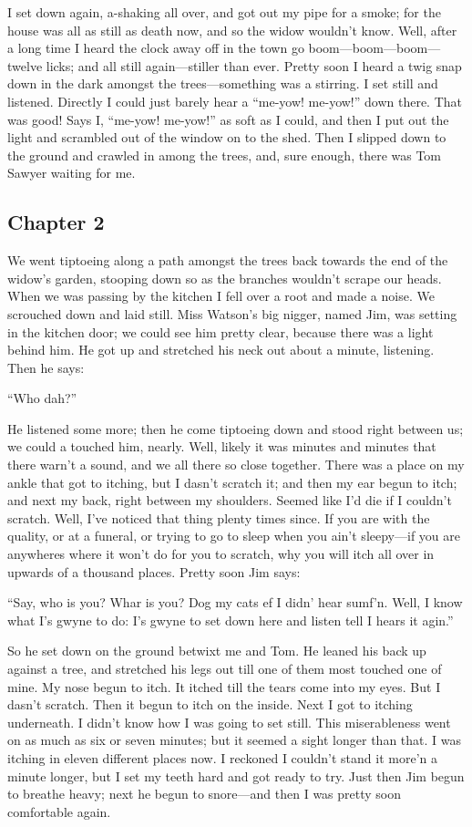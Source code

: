\documentclass[10pt,a4paper]{article}
\begin{document}
I set down again, a-shaking all over, and got out my pipe for a smoke; for the house was all as still as death now, and so the widow wouldn’t know. Well, after a long time I heard the clock away off in the town go boom—boom—boom—twelve licks; and all still again—stiller than ever. Pretty soon I heard a twig snap down in the dark amongst the trees—something was a stirring. I set still and listened. Directly I could just barely hear a “me-yow! me-yow!” down there. That was good! Says I, “me-yow! me-yow!” as soft as I could, and then I put out the light and scrambled out of the window on to the shed. Then I slipped down to the ground and crawled in among the trees, and, sure enough, there was Tom Sawyer waiting for me.
\subsection{Chapter 2}

We went tiptoeing along a path amongst the trees back towards the end of the widow’s garden, stooping down so as the branches wouldn’t scrape our heads. When we was passing by the kitchen I fell over a root and made a noise. We scrouched down and laid still. Miss Watson’s big nigger, named Jim, was setting in the kitchen door; we could see him pretty clear, because there was a light behind him. He got up and stretched his neck out about a minute, listening. Then he says:

“Who dah?”

He listened some more; then he come tiptoeing down and stood right between us; we could a touched him, nearly. Well, likely it was minutes and minutes that there warn’t a sound, and we all there so close together. There was a place on my ankle that got to itching, but I dasn’t scratch it; and then my ear begun to itch; and next my back, right between my shoulders. Seemed like I’d die if I couldn’t scratch. Well, I’ve noticed that thing plenty times since. If you are with the quality, or at a funeral, or trying to go to sleep when you ain’t sleepy—if you are anywheres where it won’t do for you to scratch, why you will itch all over in upwards of a thousand places. Pretty soon Jim says:

“Say, who is you? Whar is you? Dog my cats ef I didn’ hear sumf’n. Well, I know what I’s gwyne to do: I’s gwyne to set down here and listen tell I hears it agin.”

So he set down on the ground betwixt me and Tom. He leaned his back up against a tree, and stretched his legs out till one of them most touched one of mine. My nose begun to itch. It itched till the tears come into my eyes. But I dasn’t scratch. Then it begun to itch on the inside. Next I got to itching underneath. I didn’t know how I was going to set still. This miserableness went on as much as six or seven minutes; but it seemed a sight longer than that. I was itching in eleven different places now. I reckoned I couldn’t stand it more’n a minute longer, but I set my teeth hard and got ready to try. Just then Jim begun to breathe heavy; next he begun to snore—and then I was pretty soon comfortable again.
\end{document}
